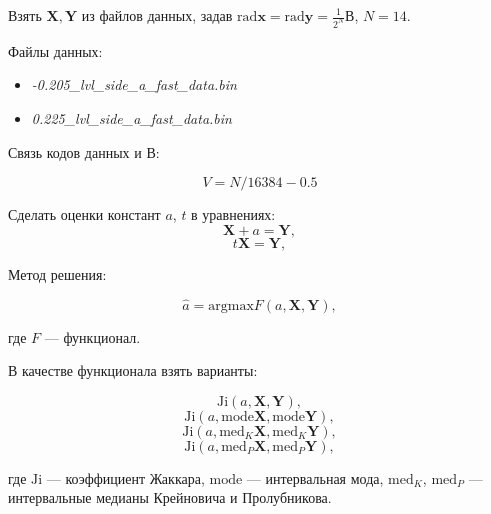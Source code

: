 \documentclass{article}
\begin{document}
  Взять \( \mathbf{X}, \mathbf{Y} \) из файлов данных, задав
  \( \text{rad} \mathbf{x} = \text{rad} \mathbf{y} = \frac{1}{2^N} \text{В} \),
  \( N = 14 \).

  Файлы данных:
  \begin{itemize}
    \item \emph{-0.205\_lvl\_side\_a\_fast\_data.bin}
    \item \emph{0.225\_lvl\_side\_a\_fast\_data.bin}
  \end{itemize}

  Связь кодов данных и В:

  \begin{equation*}
    V = N  / 16384 - 0.5
  \end{equation*}

  Сделать оценки констант \( a \), \( t \) в уравнениях:
  \begin{equation}
    \mathbf{X} + a = \mathbf{Y},
  \end{equation}
  \begin{equation}
    t\mathbf{X} = \mathbf{Y},
  \end{equation}

  Метод решения:

  \begin{equation}
    \hat a = \text{argmax} F(a, \mathbf{X}, \mathbf{Y}),
  \end{equation}

  где \( F \) --- функционал.

  В качестве функционала взять варианты:

  \begin{equation}
    \text{Ji} (a, \mathbf{X}, \mathbf{Y}),
  \end{equation}
  \begin{equation}
    \text{Ji} (a, \text{mode} \mathbf{X}, \text{mode} \mathbf{Y}),
  \end{equation}
  \begin{equation}
    \text{Ji} (a, \text{med}_K \mathbf{X}, \text{med}_K \mathbf{Y}),
  \end{equation}
  \begin{equation}
    \text{Ji} (a, \text{med}_P \mathbf{X}, \text{med}_P \mathbf{Y}),
  \end{equation}

  где \( \text{Ji} \) --- коэффициент Жаккара,
  \( \text{mode} \) --- интервальная мода,
  \( \text{med}_K \), \( \text{med}_P \) --- интервальные медианы Крейновича
  и Пролубникова.
\end{document}

